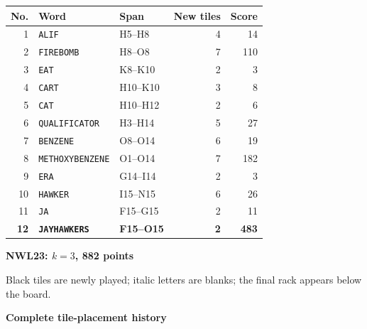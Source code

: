 \documentclass[letterpaper]{article}
\begin{document}
\begin{center}
\fontsize{8.5}{8.8}\selectfont
\setlength{\tabcolsep}{4pt}
\renewcommand{\arraystretch}{0.90}
\begin{tabular}{@{}rllrr@{}}\toprule
No. & Word & Span & New tiles & Score\\
\midrule
1 & \texttt{ALIF} & H5--H8 & 4 & 14\\
2 & \texttt{FIREBOMB} & H8--O8 & 7 & 110\\
3 & \texttt{EAT} & K8--K10 & 2 & 3\\
4 & \texttt{CART} & H10--K10 & 3 & 8\\
5 & \texttt{CAT} & H10--H12 & 2 & 6\\
6 & \texttt{QUALIFICATOR} & H3--H14 & 5 & 27\\
7 & \texttt{BENZENE} & O8--O14 & 6 & 19\\
8 & \texttt{METHOXYBENZENE} & O1--O14 & 7 & 182\\
9 & \texttt{ERA} & G14--I14 & 2 & 3\\
10 & \texttt{HAWKER} & I15--N15 & 6 & 26\\
11 & \texttt{JA} & F15--G15 & 2 & 11\\
\midrule
\textbf{12} & \textbf{\texttt{JAYHAWKERS}} & \textbf{F15--O15} & \textbf{2} & \textbf{483}\\
\bottomrule\end{tabular}
\end{center}
\vfill
\clearpage
\begin{center}
{\fontsize{11}{12}\selectfont\bfseries NWL23: $k=3$, 882 points\par}
\vspace{2pt}
\par
\vspace{1pt}
{\fontsize{7.2}{8}\selectfont Black tiles are newly played; italic letters are blanks; the final rack appears below the board.\par}
\vspace{2pt}
{\fontsize{8.5}{9}\selectfont\bfseries Complete tile-placement history\par}
\end{center}
\end{document}
